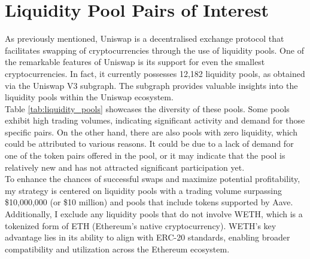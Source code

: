 \section{Liquidity Pool Pairs of Interest}
\label{sec:liquidity-pools}
As previously mentioned, Uniswap is a decentralised exchange protocol that facilitates swapping of cryptocurrencies through the use of liquidity pools. One of the remarkable features of Uniswap is its support for even the smallest cryptocurrencies. In fact, it currently possesses 12,182 liquidity pools, as obtained via the Uniswap V3 subgraph. The subgraph provides valuable insights into the liquidity pools within the Uniswap ecosystem.
\\[5mm]
Table \ref{tab:liquidity_pools} showcases the diversity of these pools. Some pools exhibit high trading volumes, indicating significant activity and demand for those specific pairs. On the other hand, there are also pools with zero liquidity, which could be attributed to various reasons. It could be due to a lack of demand for one of the token pairs offered in the pool, or it may indicate that the pool is relatively new and has not attracted significant participation yet.
\\[5mm]
To enhance the chances of successful swaps and maximize potential profitability, my strategy is centered on liquidity pools with a trading volume surpassing \$10,000,000 (or \$10 million) and pools that include tokens supported by Aave. Additionally, I exclude any liquidity pools that do not involve WETH, which is a tokenized form of ETH (Ethereum's native cryptocurrency). WETH's key advantage lies in its ability to align with ERC-20 standards, enabling broader compatibility and utilization across the Ethereum ecosystem.

